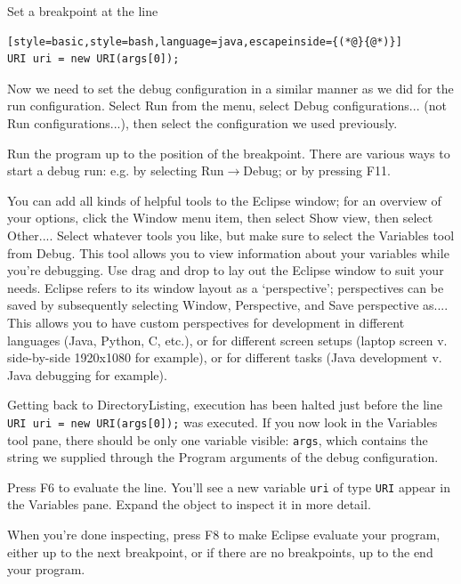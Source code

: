 \documentclass[12pt, a4paper, twoside, openany, titlepage]{book}
\begin{document}
Set a breakpoint at the line
\begin{lstlisting}[style=basic,style=bash,language=java,escapeinside={(*@}{@*)}]
URI uri = new URI(args[0]);
\end{lstlisting}

Now we need to set the debug configuration in a similar manner as we did for the run configuration. Select \textsf{Run} from the menu, select \textsf{Debug configurations...} (not \textsf{Run configurations...}), then select the configuration we used previously.

Run the program up to the position of the breakpoint. There are various ways to start a debug run: e.g. by selecting \textsf{Run}$\rightarrow$\textsf{Debug}; or by pressing \textsf{F11}.

You can add all kinds of helpful tools to the Eclipse window; for an overview of your options, click the \textsf{Window} menu item, then select \textsf{Show view}, then select \textsf{Other...}. Select whatever tools you like, but make sure to select the \textsf{Variables} tool from \textsf{Debug}. This tool allows you to view information about your variables while you're debugging. Use drag and drop to lay out the Eclipse window to suit your needs. Eclipse refers to its window layout as a `perspective'; perspectives can be saved by subsequently selecting \textsf{Window}, \textsf{Perspective}, and \textsf{Save perspective as...}. This allows you to have custom perspectives for development in different languages (Java, Python, C, etc.), or for different screen setups (laptop screen v. side-by-side 1920x1080 for example), or for different tasks (Java development v. Java debugging for example).

Getting back to \textsf{DirectoryListing}, execution has been halted just before the line \texttt{URI uri = new URI(args[0]);} was executed. If you now look in the \textsf{Variables} tool pane, there should be only one variable visible: \texttt{args}, which contains the string we supplied through the \textsf{Program arguments} of the debug configuration.

Press \textsf{F6} to evaluate the line. You'll see a new variable \texttt{uri} of type \texttt{URI} appear in the \textsf{Variables} pane. Expand the object to inspect it in more detail.

When you're done inspecting, press \textsf{F8} to make Eclipse evaluate your program, either up to the next breakpoint, or if there are no breakpoints, up to the end your program.
\end{document}
